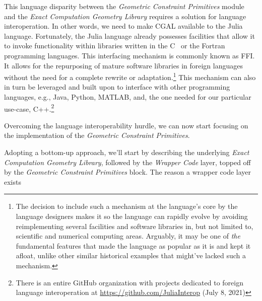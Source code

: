 This language disparity between the \textit{Geometric Constraint Primitives}
module and the \textit{Exact Computation Geometry Library} requires a solution
for language interoperation.  In other words, we need to make \ac{CGAL}
available to the Julia language.  Fortunately, the Julia language already
possesses facilities that allow it to invoke functionality within libraries
written in the C~\cite{Kernighan:1988:C} or the
Fortran~\cite{Backus:1957:Fortran} programming languages.  This interfacing
mechanism is commonly known as \ac{FFI}.  It allows for the repurposing of
mature software libraries in foreign languages without the need for a complete
rewrite or adaptation.\footnote{The decision to include such a mechanism at the
language's core by the language designers makes it so the language can rapidly
evolve by avoiding reimplementing several facilities and software libraries in,
but not limited to, scientific and numerical computing areas.  Arguably, it may
be one of \textit{the} fundamental features that made the language as popular as
it is and kept it afloat, unlike other similar historical examples that might've
lacked such a mechanism.  } This mechanism can also in
turn be leveraged and built upon to interface with other programming languages,
e.g., Java, Python, MATLAB, and, the one needed for our particular use-case,
C++.\footnote{There is an entire GitHub organization with projects dedicated to
foreign language interoperation at \url{https://github.com/JuliaInterop} (July
8, 2021)}

Overcoming the language interoperability hurdle, we can now start focusing on
the implementation of the \textit{Geometric Constraint Primitives}.

Adopting a bottom-up approach, we'll start by describing the underlying 
\textit{Exact Computation Geometry Library}, followed by the \textit{Wrapper
Code} layer, topped off by the \textit{Geometric Constraint Primitives} block.
The reason a wrapper code layer exists 
